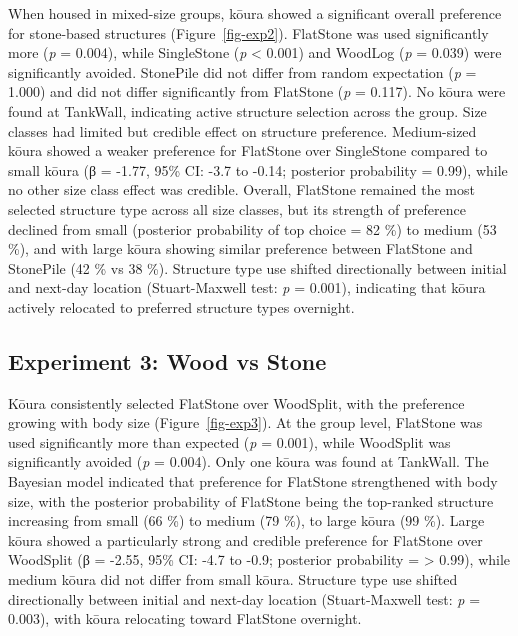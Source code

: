 \documentclass[
  12pt,
  a4paper,
  oneside]{scrbook}
\begin{document}
When housed in mixed-size groups, kōura showed a significant overall
preference for stone-based structures (Figure~\ref{fig-exp2}). FlatStone
was used significantly more (\emph{p} = 0.004), while SingleStone
(\emph{p} \textless{} 0.001) and WoodLog (\emph{p} = 0.039) were
significantly avoided. StonePile did not differ from random expectation
(\emph{p} = 1.000) and did not differ significantly from FlatStone
(\emph{p} = 0.117). No kōura were found at TankWall, indicating active
structure selection across the group. Size classes had limited but
credible effect on structure preference. Medium-sized kōura showed a
weaker preference for FlatStone over SingleStone compared to small kōura
(β = -1.77, 95\% CI: -3.7 to -0.14; posterior probability = 0.99), while
no other size class effect was credible. Overall, FlatStone remained the
most selected structure type across all size classes, but its strength
of preference declined from small (posterior probability of top choice =
82 \%) to medium (53 \%), and with large kōura showing similar
preference between FlatStone and StonePile (42 \% vs 38 \%). Structure
type use shifted directionally between initial and next-day location
(Stuart-Maxwell test: \emph{p} = 0.001), indicating that kōura actively
relocated to preferred structure types overnight.

\subsection{Experiment 3: Wood vs
Stone}\label{experiment-3-wood-vs-stone-1}

Kōura consistently selected FlatStone over WoodSplit, with the
preference growing with body size (Figure~\ref{fig-exp3}). At the group
level, FlatStone was used significantly more than expected (\emph{p} =
0.001), while WoodSplit was significantly avoided (\emph{p} = 0.004).
Only one kōura was found at TankWall. The Bayesian model indicated that
preference for FlatStone strengthened with body size, with the posterior
probability of FlatStone being the top-ranked structure increasing from
small (66 \%) to medium (79 \%), to large kōura (99 \%). Large kōura
showed a particularly strong and credible preference for FlatStone over
WoodSplit (β = -2.55, 95\% CI: -4.7 to -0.9; posterior probability =
\textgreater{} 0.99), while medium kōura did not differ from small
kōura. Structure type use shifted directionally between initial and
next-day location (Stuart-Maxwell test: \emph{p} = 0.003), with kōura
relocating toward FlatStone overnight.
\end{document}
